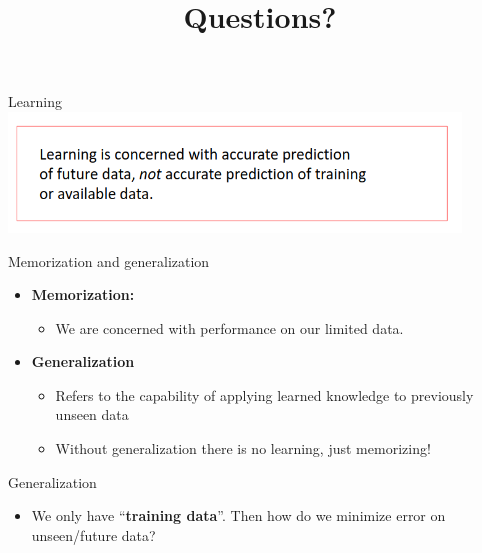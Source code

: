 \documentclass[aspectratio=169,14pt,usenames,dvipsnames]{beamer}
\begin{document}
\begin{frame}{Learning}
\centering
\includegraphics[width=0.9\textwidth, height=0.4\textheight]{Images/AIML_OFG_9.png}

\end{frame}


\begin{frame}{Memorization and generalization}
\begin{itemize}
\item \alert{\textbf{Memorization:}}
\begin{itemize}
\item We are concerned with performance on our limited data. 
\end{itemize}
\end{itemize}

\begin{itemize}
\item \alert{\textbf{Generalization}}
\begin{itemize}
\item Refers to the capability of applying learned knowledge to previously unseen data
\item Without generalization there is no learning, just memorizing!
\end{itemize}
\end{itemize}

\end{frame}

{\1
\begin{frame}
	\title{Questions?}
	\maketitle
\end{frame}}


\begin{frame}{Generalization}
\begin{itemize}

\item We only have “\alert{\textbf{training data}}”. Then how do we minimize error on unseen/future data?
 
\end{itemize}
\end{frame}
\end{document}
